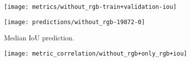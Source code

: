 \begin{figure}[H]
  \centering
  \texttt{[image: metrics/without\_rgb-train+validation-iou]}
\end{figure}

\begin{figure}[H]
  \centering
  \texttt{[image: predictions/without\_rgb-19872-0]}  %
  \caption{%
    Median IoU prediction.
  }
\end{figure}

\begin{figure}[H]
  \centering
  \texttt{[image: metric\_correlation/without\_rgb+only\_rgb+iou]}
\end{figure}
